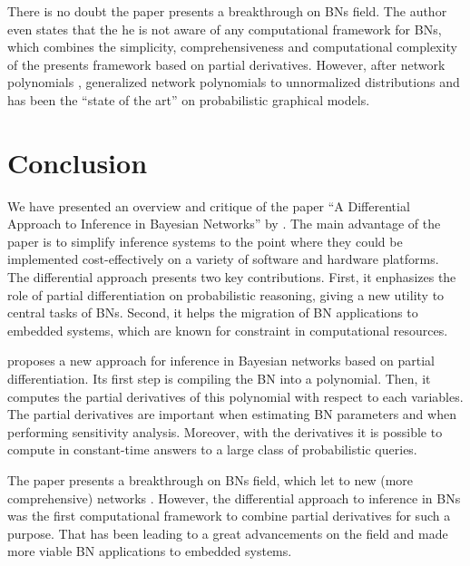 \documentclass[twoside,11pt]{article}
\begin{document}
There is no doubt the paper presents a breakthrough on BNs field.
The author even states that the he is not aware of any computational framework for BNs, which combines the simplicity, comprehensiveness and computational complexity of the presents framework based on partial derivatives.
However, after network polynomials \citep{darwiche00}, \cite{poon2011sum} generalized network polynomials to unnormalized distributions and has been the ``state of the art'' on probabilistic graphical models.

 
\section{Conclusion}
\label{sec:conc}

We have presented an overview and critique of the paper ``A Differential Approach to Inference in Bayesian Networks'' by \cite{darwiche00}.
The main advantage of the paper is to simplify inference systems to the point where they could be implemented cost-effectively on a variety of software and hardware platforms.
The differential approach presents two key contributions.
First, it enphasizes the role of partial differentiation on probabilistic reasoning, giving a new utility to central tasks of BNs.
Second, it helps the migration of BN applications to embedded systems, which are known for constraint in computational resources.

\cite{darwiche00} proposes a new approach for inference in Bayesian networks based on partial differentiation.
Its first step is compiling the BN into a polynomial.
Then, it computes the partial derivatives of this polynomial with respect to each variables.
The partial derivatives are important when estimating BN parameters and when performing sensitivity analysis.
Moreover, with the derivatives it is possible to compute in constant-time answers to a large class of probabilistic queries.

The paper presents a breakthrough on BNs field, which let to new (more comprehensive) networks \citep{poon2011sum}.
However, the differential approach to inference in BNs was the first computational framework to combine partial derivatives for such a purpose.
That has been leading to a great advancements on the field and made more viable BN applications to embedded systems.

\vskip 0.2in

\end{document}
